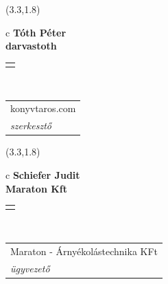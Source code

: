 \documentclass[11pt]{article}
\begin{document}
\makebox(3.3,1.8){
  \renewcommand\arraystretch{1.3}
  \begin{tabular}[c]{c}
    \hspace{8.5mm}
    \LARGE\bf{ Tóth Péter }\\
    \hspace{8.5mm}
    \Large{ darvastoth }\\
    \renewcommand\arraystretch{3}
    \begin{tabular}[c]{c}
      \centering
      \fontfamily{phv}\selectfont{
        \textbf{
          \textsc{
            \scriptsize{
            \color{Dark}{ Ismerkedő }\color{Bright}{ Webmester }\color{Bright}{ Sminkmester }\color{Bright}{ Programozó }
            }
          }
        }
      }
    \end{tabular}
    \\
    \renewcommand\arraystretch{1}
    \begin{tabular}{p{3.3in}}
      \hspace{.7cm}konyvtaros.com\\
      \hspace{.7cm}\emph{ szerkesztő }\\
    \end{tabular}
  \end{tabular}
}

\makebox(3.3,1.8){
  \renewcommand\arraystretch{1.3}
  \begin{tabular}[c]{c}
    \hspace{8.5mm}
    \LARGE\bf{ Schiefer Judit }\\
    \hspace{8.5mm}
    \Large{ Maraton Kft }\\
    \renewcommand\arraystretch{3}
    \begin{tabular}[c]{c}
      \centering
      \fontfamily{phv}\selectfont{
        \textbf{
          \textsc{
            \scriptsize{
            \color{Dark}{ Ismerkedő }\color{Bright}{ Webmester }\color{Bright}{ Sminkmester }\color{Bright}{ Programozó }
            }
          }
        }
      }
    \end{tabular}
    \\
    \renewcommand\arraystretch{1}
    \begin{tabular}{p{3.3in}}
      \hspace{.7cm}Maraton - Árnyékolástechnika KFt\\
      \hspace{.7cm}\emph{ ügyvezető }\\
    \end{tabular}
  \end{tabular}
}
\end{document}
